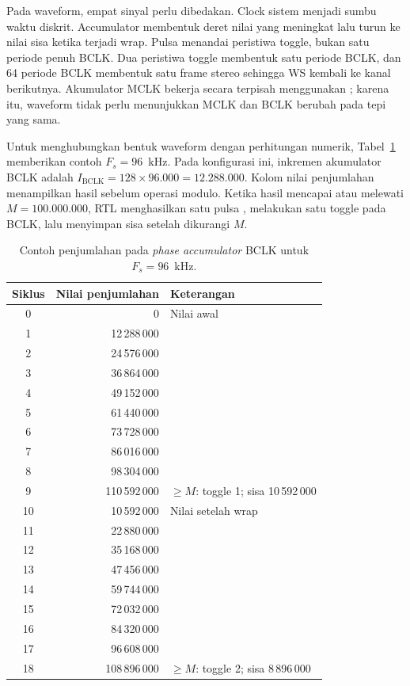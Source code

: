 Pada waveform, empat sinyal perlu dibedakan. Clock sistem menjadi sumbu waktu diskrit. Accumulator membentuk deret nilai yang meningkat lalu turun ke nilai sisa ketika terjadi wrap. Pulsa  menandai peristiwa toggle, bukan satu periode penuh BCLK. Dua peristiwa toggle membentuk satu periode BCLK, dan 64 periode BCLK membentuk satu frame stereo sehingga WS kembali ke kanal berikutnya. Akumulator MCLK bekerja secara terpisah menggunakan ; karena itu, waveform tidak perlu menunjukkan MCLK dan BCLK berubah pada tepi yang sama.

Untuk menghubungkan bentuk waveform dengan perhitungan numerik, Tabel~\ref{tab:nco-accumulator-example} memberikan contoh $F_s=96$~kHz. Pada konfigurasi ini, inkremen akumulator BCLK adalah $I_{\mathrm{BCLK}}=128\times96.000=12.288.000$. Kolom nilai penjumlahan menampilkan hasil sebelum operasi modulo. Ketika hasil mencapai atau melewati $M=100.000.000$, RTL menghasilkan satu pulsa , melakukan satu toggle pada BCLK, lalu menyimpan sisa setelah dikurangi $M$.

\begin{table}[H]
\centering
\small
\caption{Contoh penjumlahan pada \textit{phase accumulator} BCLK untuk $F_s=96$~kHz.}
\label{tab:nco-accumulator-example}
\begin{tabular}{|c|r|l|}
\hline
\textbf{Siklus} & \textbf{Nilai penjumlahan} & \textbf{Keterangan} \\
\hline
0  & 0             & Nilai awal \\
1  & 12\,288\,000  & \\
2  & 24\,576\,000  & \\
3  & 36\,864\,000  & \\
4  & 49\,152\,000  & \\
5  & 61\,440\,000  & \\
6  & 73\,728\,000  & \\
7  & 86\,016\,000  & \\
8  & 98\,304\,000  & \\
9  & 110\,592\,000 & $\geq M$: toggle 1; sisa 10\,592\,000 \\
10 & 10\,592\,000  & Nilai setelah wrap \\
11 & 22\,880\,000  & \\
12 & 35\,168\,000  & \\
13 & 47\,456\,000  & \\
14 & 59\,744\,000  & \\
15 & 72\,032\,000  & \\
16 & 84\,320\,000  & \\
17 & 96\,608\,000  & \\
18 & 108\,896\,000 & $\geq M$: toggle 2; sisa 8\,896\,000 \\
\hline
\end{tabular}
\end{table}

